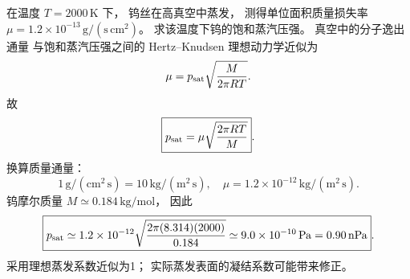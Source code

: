 在温度 $T=2000\,\mathrm K$ 下，
钨丝在高真空中蒸发，
测得单位面积质量损失率
$\mu=1.2\times10^{-13}\,
\mathrm{g/(s\,cm^2)}$。
求该温度下钨的饱和蒸汽压强。
\exsolution
真空中的分子逸出通量
与饱和蒸汽压强之间的 Hertz--Knudsen
理想动力学近似为
\[
\mu=p_{\rm sat}\sqrt{\frac{M}{2\pi RT}}.
\]
故
\[
\boxed{p_{\rm sat}=
\mu\sqrt{\frac{2\pi RT}{M}}}.
\]
换算质量通量：
\[
1\,\mathrm{g/(cm^2\,s)}
=10\,\mathrm{kg/(m^2\,s)},
\quad
\mu=1.2\times10^{-12}\,\mathrm{kg/(m^2\,s)}.
\]
钨摩尔质量
$M\simeq0.184\,\mathrm{kg/mol}$，
因此
\[
\boxed{p_{\rm sat}\simeq
1.2\times10^{-12}
\sqrt{\frac{2\pi(8.314)(2000)}{0.184}}
\simeq9.0\times10^{-10}\,\mathrm{Pa}
=0.90\,\mathrm{nPa}}.
\]
\excheck 采用理想蒸发系数近似为1；
实际蒸发表面的凝结系数可能带来修正。
